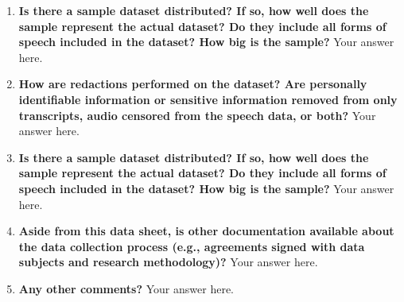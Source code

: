 \documentclass{article}
\begin{document}
  
    \begin{enumerate}[leftmargin=0.65cm]
        \scriptsize

        \item \textbf{Is there a sample dataset distributed? If so, how well does the sample represent the actual dataset? Do they include all forms of speech included in the dataset? How big is the sample?}
        \newline 
        Your answer here.
        \newline 
       \item \textbf{How are redactions performed on the dataset? Are personally identifiable information or sensitive information removed from only transcripts, audio censored from the speech data, or both?}
        \newline 
        Your answer here.
        \newline 
         \item \textbf{Is there a sample dataset distributed? If so, how well does the sample represent the actual dataset? Do they include all forms of speech included in the dataset? How big is the sample?}
        \newline 
        Your answer here.
        \newline         
         \item \textbf{Aside from this data sheet, is other documentation available about the data collection process (e.g., agreements signed with data subjects and research methodology)?}
        \newline 
        Your answer here.
        \newline 
        \item \textbf{Any other comments?}
        \newline 
        Your answer here.
        \newline 
    \end{enumerate}
\end{document}
